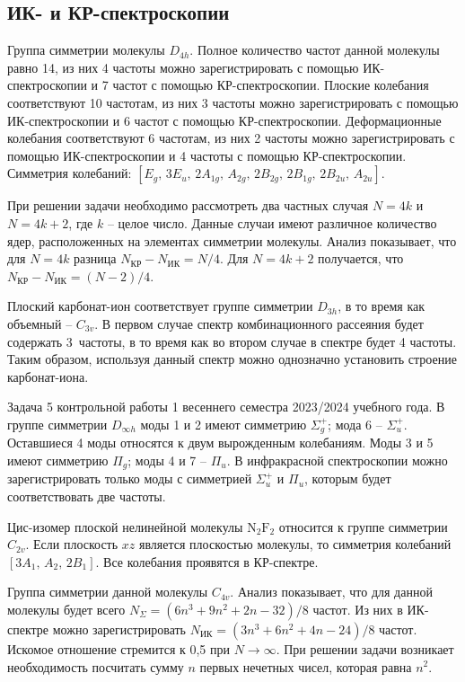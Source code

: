 \subsection{ИК- и КР-спектроскопии}
 Группа симметрии молекулы $D_{4h}$. Полное количество частот данной молекулы равно 14, из них 4 частоты можно зарегистрировать с помощью ИК-спектроскопии и 7 частот с помощью КР-спектроскопии. Плоские колебания соответствуют 10 частотам, из них 3 частоты можно зарегистрировать с помощью ИК-спектроскопии и 6 частот с помощью КР-спектроскопии. Деформационные колебания соответствуют 6 частотам, из них 2 частоты можно зарегистрировать с помощью ИК-спектроскопии и 4 частоты с помощью КР-спектроскопии. Симметрия колебаний: $\left[ E_g\text{,}\,\,3 E_u\text{,}\,\,2 A_{1g}\text{,}\,\,A_{2g}\text{,}\,\,2 B_{2g}\text{,}\,\,2 B_{1g}\text{,}\,\,2B_{2u}\text{,}\,\,A_{2u} \right]$.\par
{} При решении задачи необходимо рассмотреть два частных случая $N=4k$ и~$N=4k+2$, где $k$ – целое число. Данные случаи имеют различное количество ядер, расположенных на элементах симметрии молекулы. Анализ показывает, что для $N=4k$ разница $N_{\text{КР}} - N_{\text{ИК}} = N/4$. Для $N=4k + 2$ получается, что $N_{\text{КР}} - N_{\text{ИК}} = (N-2)/4$.\par
{} Плоский карбонат-ион соответствует группе симметрии $D_{3h}$, в то время как объемный – $C_{3v}$. В первом случае спектр комбинационного рассеяния будет содержать 3~частоты, в то время как во втором случае в спектре будет 4 частоты. Таким образом, используя данный спектр можно однозначно установить строение карбонат-иона.\par
{} Задача 5 контрольной работы 1 весеннего семестра 2023/2024 учебного года. В группе симметрии $D_{\infty h}$ моды 1 и 2 имеют симметрию $\Sigma_g^+$; мода 6 – $\Sigma_u^+$. Оставшиеся 4 моды относятся к двум вырожденным колебаниям. Моды 3 и 5 имеют симметрию $\Pi_g$; моды 4 и 7 – $\Pi_u$. В инфракрасной спектроскопии можно зарегистрировать только моды с симметрией $\Sigma_u^+$ и $\Pi_u$, которым будет соответствовать две частоты.\par
{} Цис-изомер плоской нелинейной молекулы $\text{N}_2\text{F}_2$ относится к группе симметрии $C_{2v}$. Если плоскость $xz$ является плоскостью молекулы, то симметрия колебаний $\left[ 3 A_1\text{,}\,\, A_2\text{,} \,\, 2 B_1 \right]$. Все колебания проявятся в КР-спектре.\par
{} Группа симметрии данной молекулы $C_{4v}$. Анализ показывает, что для данной молекулы будет всего $N_{\Sigma}= \left( 6n^3 + 9n^2 + 2n - 32 \right) / 8$ частот. Из них в ИК-спектре можно зарегистрировать $N_{\text{ИК}} = \left( 3n^3 + 6n^2 + 4n - 24 \right) / 8$ частот. Искомое отношение стремится к 0,5 при $N \rightarrow \infty$. При решении задачи возникает необходимость посчитать сумму $n$ первых нечетных чисел, которая равна $n^2$.\par
